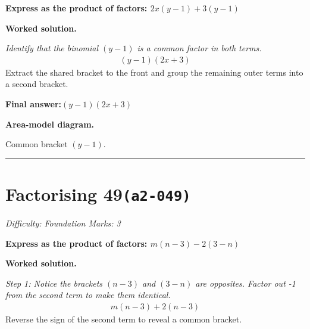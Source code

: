 \documentclass[11pt]{article}
\newcommand{\question}[1]{\par\medskip\noindent\textbf{#1}\par}
\begin{document}
\question{Express as the product of factors: \( 2x(y-1) + 3(y-1) \)}

\textbf{Worked solution.}

\textit{Identify that the binomial \( (y-1) \) is a common factor in both terms.}
\[\begin{gathered}
(y-1)(2x + 3)
\end{gathered}\]
Extract the shared bracket to the front and group the remaining outer terms into a second bracket.

\begin{answerbox}
\textbf{Final answer:}\quad \(\displaystyle (y-1)(2x + 3)\)
\end{answerbox}
\textbf{Area-model diagram.}

\begin{center}
\end{center}
\small Common bracket $(y-1)$.\normalsize

\medskip\hrule

\section*{Factorising 49\quad\small\texttt{(a2-049)}}
\textit{Difficulty: Foundation \quad\textbar\quad Marks: 3}

\question{Express as the product of factors: \( m(n-3) - 2(3-n) \)}

\textbf{Worked solution.}

\textit{Step 1: Notice the brackets \( (n-3) \) and \( (3-n) \) are opposites. Factor out -1 from the second term to make them identical.}
\[\begin{gathered}
m(n-3) + 2(n-3)
\end{gathered}\]
Reverse the sign of the second term to reveal a common bracket.
\end{document}
